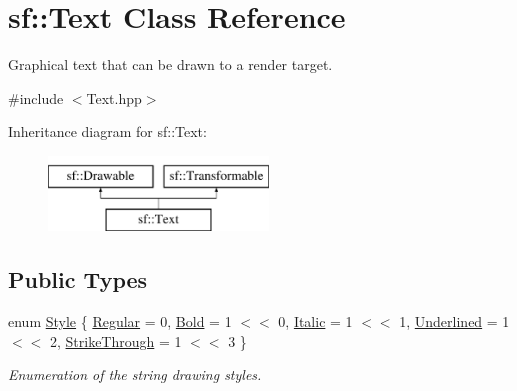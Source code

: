 \hypertarget{classsf_1_1_text}{}\section{sf\+:\+:Text Class Reference}
\label{classsf_1_1_text}


Graphical text that can be drawn to a render target.  




{\ttfamily \#include $<$Text.\+hpp$>$}

Inheritance diagram for sf\+:\+:Text\+:\begin{figure}[H]
\begin{center}
\leavevmode
\includegraphics[height=2.000000cm]{classsf_1_1_text}
\end{center}
\end{figure}
\subsection*{Public Types}
\begin{DoxyCompactItemize}
\item 
enum \mbox{\hyperlink{classsf_1_1_text_aa8add4aef484c6e6b20faff07452bd82}{Style}} \{ \newline
\mbox{\hyperlink{classsf_1_1_text_aa8add4aef484c6e6b20faff07452bd82a2af9ae5e1cda126570f744448e0caa32}{Regular}} = 0, 
\mbox{\hyperlink{classsf_1_1_text_aa8add4aef484c6e6b20faff07452bd82af1b47f98fb1e10509ba930a596987171}{Bold}} = 1 $<$$<$ 0, 
\mbox{\hyperlink{classsf_1_1_text_aa8add4aef484c6e6b20faff07452bd82aee249eb803848723c542c2062ebe69d8}{Italic}} = 1 $<$$<$ 1, 
\mbox{\hyperlink{classsf_1_1_text_aa8add4aef484c6e6b20faff07452bd82a664bd143f92b6e8c709d7f788e8b20df}{Underlined}} = 1 $<$$<$ 2, 
\newline
\mbox{\hyperlink{classsf_1_1_text_aa8add4aef484c6e6b20faff07452bd82a9ed1f5bb154c21269e1190c5aa97d479}{Strike\+Through}} = 1 $<$$<$ 3
 \}
\begin{DoxyCompactList}\small\item\em Enumeration of the string drawing styles. \end{DoxyCompactList}\end{DoxyCompactItemize}

